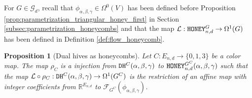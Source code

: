 \documentclass[11pt,a4paper]{amsart}
\providecommand{\honey}{\texttt{\textsc{HONEY}}}
\providecommand{\dualhive}{\texttt{\textsc{DH}}}
\numberwithin{equation}{section}
\newtheorem{proposition}[theorem]{Proposition}
\theoremstyle{definition}
\begin{document}
\noindent
For $G\in\mathcal{G}_d$, recall that 
$\phi_{\alpha,\beta,\gamma} \in \Omega^0(V)$ has been 
defined before Proposition \ref{prop:parametrization_triangular_honey_first}
in Section \ref{subsec:parametrization_honeycombs} and 
that the map $\mathcal{L}: \honey_{n,d}^{G} \to \Omega^1(G)$ 
has been defined in Definition \ref{def:flow_honeycomb}.

\begin{proposition}[Dual hives as honeycombs]
    \label{lem:hive_honey_final}
    Let $C:E_{n,d}\rightarrow\{0,1,3\}$ be a color map. 
    The map $\rho_C$ is a injection from 
    $\dualhive^C(\alpha,\beta,\gamma)$ to 
    $\honey_{n,d}^{G^C}(\alpha,\beta,\gamma)$ such that the map 
    $ \mathcal{L} \circ \rho_C: \dualhive^C(\alpha,\beta,\gamma) 
    \rightarrow \Omega^1(G^C)$ 
    is the restriction of an affine map with integer coefficients from 
    $\mathbb{R}^{E_{n,d}}$ to $\mathcal{F}_{G^C}(\phi_{\alpha,\beta,\gamma})$.
\end{proposition}
\end{document}
